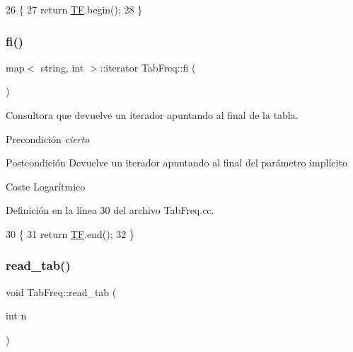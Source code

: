 \begin{DoxyCode}
26                                       \{
27   \textcolor{keywordflow}{return} \hyperlink{class_tab_freq_ae6be9a9671af1d897960648e10a62cfb}{TF}.begin();
28 \}
\end{DoxyCode}
\mbox{\label{class_tab_freq_acaa682bda54944915db86e012756cef8}} 
\subsubsection{\texorpdfstring{fi()}{fi()}}
{\footnotesize\ttfamily map$<$ string, int $>$\+::iterator Tab\+Freq\+::fi (\begin{DoxyParamCaption}{ }\end{DoxyParamCaption})}



Consultora que devuelve un iterador apuntando al final de la tabla. 

\begin{DoxyPrecond}{Precondición}
{\itshape cierto} 
\end{DoxyPrecond}
\begin{DoxyPostcond}{Postcondición}
Devuelve un iterador apuntando al final del parámetro implícito 
\end{DoxyPostcond}
\begin{DoxyParagraph}{Coste}
Logarítmico 
\end{DoxyParagraph}


Definición en la línea 30 del archivo Tab\+Freq.\+cc.


\begin{DoxyCode}
30                                    \{
31   \textcolor{keywordflow}{return} \hyperlink{class_tab_freq_ae6be9a9671af1d897960648e10a62cfb}{TF}.end();
32 \}
\end{DoxyCode}
\mbox{\label{class_tab_freq_aa84cb3ed7c4958be0bfe4fbd8c6c0e6a}} 
\subsubsection{\texorpdfstring{read\+\_\+tab()}{read\_tab()}}
{\footnotesize\ttfamily void Tab\+Freq\+::read\+\_\+tab (\begin{DoxyParamCaption}\item[{int}]{n }\end{DoxyParamCaption})}



